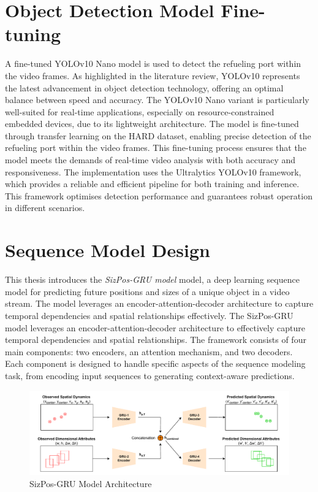 \documentclass[12pt,oneside]{book} %
\begin{document}
\section{Object Detection Model Fine-tuning}
A fine-tuned YOLOv10 Nano model is used to detect the refueling port within the
video frames. As highlighted in the literature review, YOLOv10 represents the
latest advancement in object detection technology, offering an optimal balance
between speed and accuracy. The YOLOv10 Nano variant is particularly
well-suited for real-time applications, especially on resource-constrained
embedded devices, due to its lightweight architecture. The model is fine-tuned
through transfer learning on the HARD dataset, enabling precise detection of
the refueling port within the video frames. This fine-tuning process ensures
that the model meets the demands of real-time video analysis with both accuracy
and responsiveness. The implementation uses the Ultralytics YOLOv10 framework,
which provides a reliable and efficient pipeline for both training and
inference. This framework optimises detection performance and guarantees robust
operation in different scenarios.

\section{Sequence Model Design}
This thesis introduces the \textit{SizPos-GRU model} model, a deep learning
sequence model for predicting future positions and sizes of a unique object in
a video stream. The model leverages an encoder-attention-decoder architecture
to capture temporal dependencies and spatial relationships effectively. The
SizPos-GRU model leverages an encoder-attention-decoder architecture to
effectively capture temporal dependencies and spatial relationships. The
framework consists of four main components: two encoders, an attention
mechanism, and two decoders. Each component is designed to handle specific
aspects of the sequence modeling task, from encoding input sequences to
generating context-aware predictions.

\begin{figure}[H]
    \centering
    \includegraphics[width=1\textwidth]{figures/GRUSizPos.drawio.pdf}
    \caption{SizPos-GRU Model Architecture}\label{fig:sizpos-gru}
\end{figure}
\end{document}
